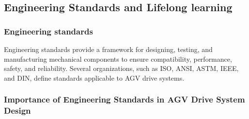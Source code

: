 \documentclass[../../main]{subfiles}
\begin{document}

\subsection{Engineering Standards and Lifelong learning}
\subsubsection{Engineering standards}
Engineering standards provide a framework for designing, testing,
and manufacturing mechanical components to ensure compatibility, 
performance, safety, and reliability. Several organizations, such as 
ISO, ANSI, ASTM, IEEE, and DIN, define standards applicable to AGV drive systems.

\subsubsection{Importance of Engineering Standards in AGV Drive System Design}
\end{document}
